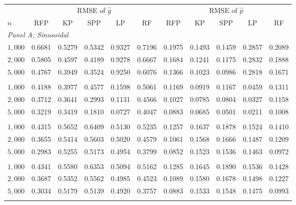 \begin{tabular}{l@{\hspace{2em}}ccccc@{\hspace{2em}}ccccc}
\toprule
&
\multicolumn{5}{c}{RMSE of $\widehat{g}$}
&
\multicolumn{5}{c}{RMSE of $\widehat{p}$}
\\
\cmidrule(lr){2-6}
\cmidrule(lr){7-11}
$n$
& RFP & KP & SPP & LP & RF
& RFP & KP & SPP & LP & RF
\\
\midrule

	\multicolumn{11}{l}{\textit{Panel A: Sinusoidal}}\\
	$1{,}000$
	& 0.6681 & 0.5279 & 0.5342 & 0.9327 & 0.7196
	& 0.1975 & 0.1493 & 0.1459 & 0.2857 & 0.2089
	\\
	$2{,}000$
	& 0.5805 & 0.4597 & 0.4189 & 0.9278 & 0.6667
	& 0.1684 & 0.1241 & 0.1175 & 0.2832 & 0.1888
	\\
	$5{,}000$
	& 0.4767 & 0.3949 & 0.3524 & 0.9250 & 0.6076
	& 0.1366 & 0.1023 & 0.0986 & 0.2818 & 0.1671
	\\
	\addlinespace

	\multicolumn{11}{l}{\textit{Panel B: Sigmoid, $\kappa=1$}}\\
	$1{,}000$
	& 0.4188 & 0.3977 & 0.4577 & 0.1598 & 0.5061
	& 0.1169 & 0.0919 & 0.1167 & 0.0459 & 0.1311
	\\
	$2{,}000$
	& 0.3712 & 0.3641 & 0.2993 & 0.1131 & 0.4566
	& 0.1027 & 0.0785 & 0.0804 & 0.0327 & 0.1158
	\\
	$5{,}000$
	& 0.3219 & 0.3419 & 0.1810 & 0.0727 & 0.4047
	& 0.0883 & 0.0685 & 0.0501 & 0.0211 & 0.1008
	\\
	\addlinespace

	\multicolumn{11}{l}{\textit{Panel C: Sigmoid, $\kappa=100$}}\\
	$1{,}000$
	& 0.4315 & 0.5652 & 0.6409 & 0.5130 & 0.5235
	& 0.1257 & 0.1637 & 0.1878 & 0.1524 & 0.1410
	\\
	$2{,}000$
	& 0.3655 & 0.5414 & 0.5603 & 0.5020 & 0.4579
	& 0.1061 & 0.1568 & 0.1666 & 0.1487 & 0.1209
	\\
	$5{,}000$
	& 0.2983 & 0.5255 & 0.5173 & 0.4954 & 0.3799
	& 0.0852 & 0.1523 & 0.1536 & 0.1463 & 0.0972
	\\
	\addlinespace

	\multicolumn{11}{l}{\textit{Panel D: Threshold}}\\
	$1{,}000$
	& 0.4341 & 0.5580 & 0.6353 & 0.5094 & 0.5162
	& 0.1285 & 0.1645 & 0.1890 & 0.1536 & 0.1428
	\\
	$2{,}000$
	& 0.3687 & 0.5352 & 0.5562 & 0.4985 & 0.4523
	& 0.1089 & 0.1580 & 0.1678 & 0.1498 & 0.1227
	\\
	$5{,}000$
	& 0.3034 & 0.5179 & 0.5139 & 0.4920 & 0.3757
	& 0.0883 & 0.1533 & 0.1548 & 0.1475 & 0.0993
	\\
	\addlinespace


\end{tabular}
